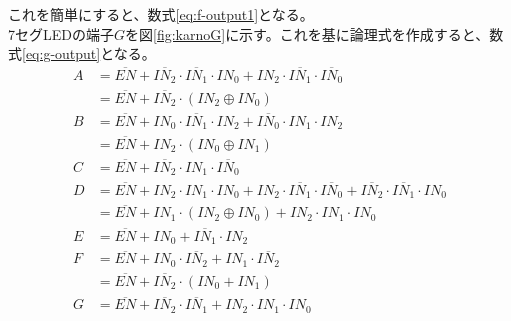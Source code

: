 \documentclass[a4paper,11pt,dvipdfmx]{jsarticle}
\begin{document}
これを簡単にすると、数式\eqref{eq:f-output1}となる。\\
7セグLEDの端子$G$を図\ref{fig:karnoG}に示す。これを基に論理式を作成すると、数式\eqref{eq:g-output}となる。
\begin{align}
  A &= \overline{EN} + \overline{IN_2} \cdot \overline{IN_1} \cdot IN_0 + IN_2 \cdot \overline{IN_1} \cdot \overline{IN_0} \label{eq:a-output}\\
  &= \overline{EN} + \overline{IN_2} \cdot ( IN_2 \oplus IN_0)\label{eq:a-output1}\\
  B &= \overline{EN} + IN_0 \cdot \overline{IN_1} \cdot IN_2 + \overline{IN_0} \cdot IN_1 \cdot IN_2 \label{eq:b-output}\\
  &= \overline{EN} + IN_2 \cdot (IN_0 \oplus IN_1  ) \label{eq:b-output1}\\
  C &= \overline{EN} + \overline{IN_2} \cdot IN_1 \cdot \overline{IN_0}\label{eq:c-output}\\
  D &= \overline{EN} + IN_2 \cdot IN_1 \cdot IN_0 + IN_2 \cdot \overline{IN_1} \cdot \overline{IN_0} + \overline{IN_2} \cdot \overline{IN_1} \cdot IN_0\label{eq:d-output}\\
  &= \overline{EN} + IN_1 \cdot (IN_2 \oplus IN_0) + IN_2 \cdot IN_1 \cdot IN_0\label{eq:d-output1}\\
  E &= \overline{EN} + IN_0 + \overline{IN_1} \cdotp IN_2\label{eq:e-output}\\
  F &= \overline{EN} + IN_0 \cdot \overline{IN_2} + IN_1 \cdot \overline{IN_2}\label{eq:f-output}\\
  &= \overline{EN} + \overline{IN_2} \cdot (IN_0 + IN_1) \label{eq:f-output1}\\
  G &= \overline{EN} + \overline{IN_2} \cdot \overline{IN_1}+ IN_2 \cdot IN_1 \cdot IN_0\label{eq:g-output}
\end{align}
\end{document}
